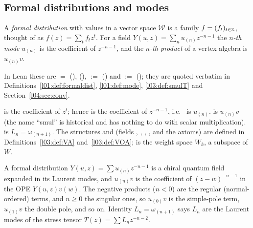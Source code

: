 \subsection{Formal distributions and modes}

\begin{definition}\label{ch04:def:mode}
A \emph{formal distribution} with values in a vector space $\mathcal W$ is a family
$f=(f_t)_{t\in{\mathbb{Z}}}$, thought of as $f(z)=\sum_t f_t z^t$. For a field
$Y(u,z)=\sum_n u_{(n)}z^{-n-1}$ the \emph{$n$-th mode} $u_{(n)}$ is the coefficient of
$z^{-n-1}$, and the \emph{$n$-th product} of a vertex algebra is $u_{(n)}v$.
\end{definition}

In Lean these are  $=$  (),
 (),
 $:=$  () and
 $:=$ 
(); they are quoted verbatim in
Definitions~\ref{l01:def:formaldist}, \ref{l01:def:mode}, \ref{l03:def:smulT} and
Section~\ref{l04:sec:conv}.

\begin{dictionary}
 is the coefficient of $z^t$; hence  is the coefficient of
$z^{-n-1}$, i.e.\  is $u_{(n)}$.  is $u_{(n)}v$ (the name
``smul'' is historical and has nothing to do with scalar multiplication).  is
$L_n=\omega_{(n+1)}$. The structures  and 
(fields , , , ,  and
the axioms) are defined in Definitions~\ref{l03:def:VA} and~\ref{l03:def:VOA};  is the weight space $W_k$, a
subspace of $W$.
\end{dictionary}

\begin{physics}
A formal distribution $Y(u,z)=\sum u_{(n)}z^{-n-1}$ is a chiral quantum field expanded in its Laurent modes, and $u_{(n)}v$ is the coefficient of $(z-w)^{-n-1}$ in the OPE $Y(u,z)v(w)$. The negative products ($n<0$) are the regular (normal-ordered) terms, and $n\ge0$ the singular ones, so $u_{(0)}v$ is the simple-pole term, $u_{(1)}v$ the double pole, and so on. Identity $L_n=\omega_{(n+1)}$ says $L_n$ are the Laurent modes of the stress tensor $T(z)=\sum L_nz^{-n-2}$.
\end{physics}

